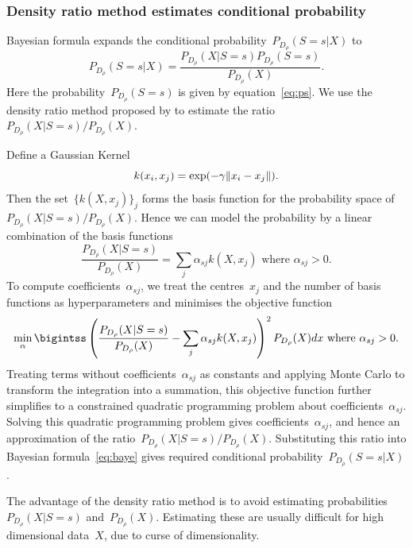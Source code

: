 \documentclass[12pt]{article} %
\DeclarePairedDelimiter{\norm}{\lVert}{\rVert}
\begin{document}
\subsubsection{Density ratio method estimates conditional probability}\label{method22}
Bayesian formula expands the conditional probability~$P_{D_\rho}(S=s|X)$ to
\begin{equation}
   P_{D_\rho}(S=s|X)=\frac{P_{D_\rho}(X|S=s)P_{D_\rho}(S=s)}{P_{D_\rho}(X)}.\label{eq:baye}
\end{equation}
Here the probability~$P_{D_\rho}(S=s)$ is given by equation~\eqref{eq:ps}. We use the density ratio method proposed by \citet{DBLP:journals/jmlr/KanamoriHS09} to estimate the ratio~${P_{D_\rho}(X|S=s)}/{P_{D_\rho}(X)}$.

Define a Gaussian Kernel 
\begin{equation}\label{eq:gauss}
k(x_i,x_j)=\exp(-\gamma\norm{x_i-x_j}).
\end{equation} 
Then the set~$\{k(X,x_j) \}_j$ forms the basis function for the probability space of ${P_{D_\rho}(X|S=s)}/{P_{D_\rho}(X)}$. Hence we can model the probability by a linear combination of the basis functions
\begin{equation*}
   \frac{P_{D_\rho}(X|S=s)}{P_{D_\rho}(X)}=\sum_j \alpha_{sj} k(X,x_j) \text{ where }\alpha_{sj}>0.%
\end{equation*}
To compute coefficients~$\alpha_{sj}$, we treat the centres~$x_j$ and the number of basis functions as hyperparameters and minimises the objective function
\begin{equation*}
  \min_\alpha \bigintss \left(\frac{P_{D_\rho}(X|S=s)}{P_{D_\rho}(X)}-\sum_j \alpha_{sj} k(X,x_j)\right)^2P_{D_\rho}(X)dx \text{ where }\alpha_{sj}>0.
\end{equation*}
Treating terms without coefficients~$\alpha_{sj}$ as constants and applying Monte Carlo to transform the integration into a summation, this objective function further simplifies to a constrained quadratic programming problem about coefficients~$\alpha_{sj}$. Solving this quadratic programming problem gives coefficients~$\alpha_{sj}$, and hence an approximation of the ratio~${P_{D_\rho}(X|S=s)}/{P_{D_\rho}(X)}$. Substituting this ratio into Bayesian formula~\eqref{eq:baye} gives required conditional probability~$P_{D_\rho}(S=s|X)$.

The advantage of the density ratio method is to avoid estimating probabilities~${P_{D_\rho}(X|S=s)}$ and~${P_{D_\rho}(X)}$. Estimating these are usually difficult for high dimensional data~$X$, due to curse of dimensionality. 
\end{document}
